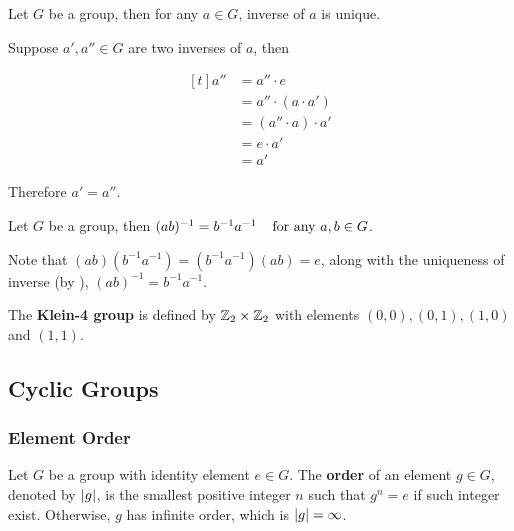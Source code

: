 \documentclass[a4paper,12pt]{article}
\begin{document}
\begin{pst}
  Let $G$ be a group, then for any $a\in G$, inverse of $a$ is unique.\n

  \prf Suppose $a',a''\in G$ are two inverses of $a$, then

  $$\begin{aligned}[t]
    a''&=a''\cdot e\\
    &=a''\cdot(a\cdot a')\\
    &=(a''\cdot a)\cdot a'\\
    &=e\cdot a'\\
    &=a'
  \end{aligned}$$

  Therefore $a'=a''$.
\end{pst}\n

\begin{pst}
  Let $G$ be a group, then $(ab)^{-1}=b^{-1}a^{-1}\;\;\;\;\text{for any }a,b\in G$.\n

  \prf Note that $(ab)(b^{-1}a^{-1})=(b^{-1}a^{-1})(ab)=e$, along with the uniqueness of inverse (by \rpst[\sctd{2}]), $(ab)^{-1}=b^{-1}a^{-1}$.
\end{pst}\n

\n

\begin{dft}
  The \textbf{Klein-4 group} is defined by $\mathbb{Z}_{2}\times\mathbb{Z}_{2}$ with elements $(0,0),(0,1),(1,0)$ and $(1,1)$.
\end{dft}

\subsection{Cyclic Groups}
\subsubsection{Element Order}
\begin{dft}
  Let $G$ be a group with identity element $e\in G$. The \textbf{order} of an element $g\in G$, denoted by $\left| g\right|$, is the smallest positive integer $n$ such that $g^{n}=e$ if such integer exist. Otherwise, $g$ has infinite order, which is $\left| g\right|=\infty$.
\end{dft}\n
\end{document}
